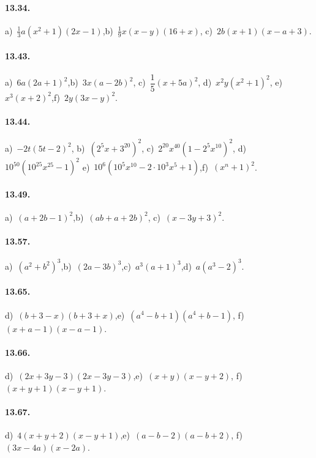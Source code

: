 \paragraph{13.34.}
a)~$\frac{1}{3}a(x^{2}+1)(2x-1)$,\quad b)~$\frac{1}{9}x(x-y)(16+x)$, \quad c)~$2b(x+1)(x-a+3)$.

\paragraph{13.43.}
a)~$6a(2a+1)^{2}$,\quad b)~$3x(a-2b)^{2}$, \quad c)~$\dfrac{1}{5}(x+5a)^{2}$, \quad d)~$x^{2}y\left(x^{2}+1\right)^{2}$, \quad e)~$x^{3}(x+2)^{2}$,\quad f)~$2y(3x-y)^{2}$.

\paragraph{13.44.}
a)~$-2t(5t-2)^{2}$, \quad b)~$\left(2^{5}x+3^{20}\right)^{2}$, \quad c)~$2^{20} x^{40}\left(1-2^{5}x^{10} \right)^2$, \quad d)~$10^{50}\left(10^{25} x^{25}-1 \right)^2$ \quad e)~$10^{6} \left(10^{5} x^{10}-2 \cdot 10^{3}x^{5}+1\right)$,\quad f)~$\left(x^{n}+1\right)^2$.

\paragraph{13.49.}
a)~$(a+2b-1)^{2}$,\quad b)~$(ab+a+2b)^{2}$, \quad c)~$(x-3y+3)^{2}$.

\paragraph{13.57.}
a)~$\left(a^{2}+b^{2}\right)^{3}$,\quad b)~$(2a-3b)^{3}$,\quad c)~$a^{3}(a+1)^{3}$,\quad d)~$a\left(a^3-2\right)^3$.

\paragraph{13.65.}
d)~$(b+3-x)(b+3+x)$,\quad e)~$(a^{4}-b+1)(a^{4}+b-1)$, \quad f)~$(x+a-1)(x-a-1)$.

\paragraph{13.66.}
d)~$(2x+3y-3)(2x-3y-3)$,\quad e)~$(x+y)(x-y+2)$, \quad f)~$(x+y+1)(x-y+1)$.

\paragraph{13.67.}
d)~$4(x+y+2)(x-y+1)$,\quad e)~$(a-b-2)(a-b+2)$, \quad f)~$(3x-4a)(x-2a)$.

